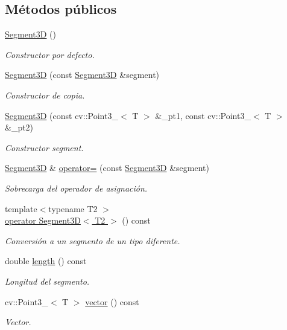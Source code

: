 \subsection*{Métodos públicos}
\begin{DoxyCompactItemize}
\item 
\hyperlink{group___geometric_entities_ga726c1cdb80b816445604fc035f0b709b}{Segment3D} ()
\begin{DoxyCompactList}\small\item\em Constructor por defecto. \end{DoxyCompactList}\item 
\hyperlink{group___geometric_entities_gad0a6b6c727b4f675429acb7a28518cbd}{Segment3D} (const \hyperlink{class_i3_d_1_1_segment3_d}{Segment3D} \&segment)
\begin{DoxyCompactList}\small\item\em Constructor de copia. \end{DoxyCompactList}\item 
\hyperlink{group___geometric_entities_ga7a2024be1820ddc19158004932d79882}{Segment3D} (const cv\+::\+Point3\+\_\+$<$ T $>$ \&\+\_\+pt1, const cv\+::\+Point3\+\_\+$<$ T $>$ \&\+\_\+pt2)
\begin{DoxyCompactList}\small\item\em Constructor segment. \end{DoxyCompactList}\item 
\hyperlink{class_i3_d_1_1_segment3_d}{Segment3D} \& \hyperlink{group___geometric_entities_gaa95bd137286b52bc178a569720bea3d6}{operator=} (const \hyperlink{class_i3_d_1_1_segment3_d}{Segment3D} \&segment)
\begin{DoxyCompactList}\small\item\em Sobrecarga del operador de asignación. \end{DoxyCompactList}\item 
{\footnotesize template$<$typename T2 $>$ }\\\hyperlink{group___geometric_entities_ga0a05ef1543e77df2c3dc9e40d2126b28}{operator Segment3\+D$<$ T2 $>$} () const 
\begin{DoxyCompactList}\small\item\em Conversión a un segmento de un tipo diferente. \end{DoxyCompactList}\item 
double \hyperlink{class_i3_d_1_1_segment3_d_a3194ca3e7b47dd389a460a7609ee4c1c}{length} () const 
\begin{DoxyCompactList}\small\item\em Longitud del segmento. \end{DoxyCompactList}\item 
cv\+::\+Point3\+\_\+$<$ T $>$ \hyperlink{class_i3_d_1_1_segment3_d_a4ac8bf44e4879682ee1626c5b74dbb3d}{vector} () const 
\begin{DoxyCompactList}\small\item\em Vector. \end{DoxyCompactList}\end{DoxyCompactItemize}
